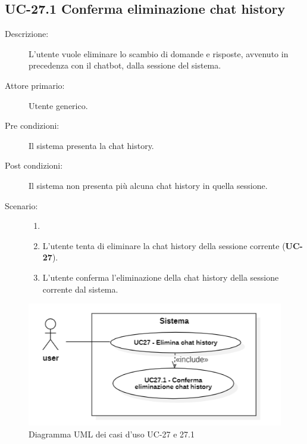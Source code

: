 \subsection{UC-27.1 Conferma eliminazione chat history}
\begin{description}
    \item[Descrizione:] L'utente vuole eliminare lo scambio di domande e risposte, avvenuto in precedenza con il chatbot, dalla sessione del sistema.
    \item[Attore primario:] Utente generico.
    \item[Pre condizioni:] Il sistema presenta la chat history.
    \item[Post condizioni:] Il sistema non presenta più alcuna chat history in quella sessione.
    \item[Scenario:]
    \begin{enumerate}
        \item[]
        \item L'utente tenta di eliminare la chat history della sessione corrente (\textbf{UC-27}).
        \item L'utente conferma l'eliminazione della chat history della sessione corrente dal sistema.
    \end{enumerate}
\end{description}

\begin{figure}[H]
    \centering
    \includegraphics[width=0.9\linewidth]{UC27.PNG} 
    \caption{Diagramma UML dei casi d'uso UC-27 e 27.1}
\end{figure}


